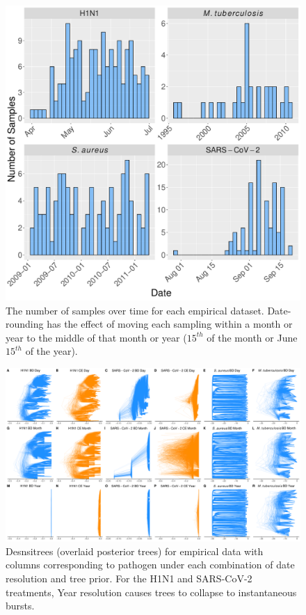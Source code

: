 \documentclass[12pt]{article}
\begin{document}
\begin{figure}[H]
    \centering
    \includegraphics[width=\textwidth]{figures/empirical_sampling_times.pdf}
    \caption{The number of samples over time for each empirical dataset. Date-rounding has the effect of moving each sampling within a month or year to the middle of that month or year ($15^{th}$ of the month or June $15^{th}$ of the year).}
    \label{fig:sampling}
\end{figure}

\begin{figure}[H]
    \centering
    \includegraphics[width=\textwidth]{empirical_densitrees.pdf}
    \caption{Desnsitrees (overlaid posterior trees) for empirical data with columns corresponding to pathogen under each combination of date resolution and tree prior. For the H1N1 and SARS-CoV-2 treatments, Year resolution causes trees to collapse to instantaneous bursts.}
    \label{fig:densitree}
\end{figure}
\end{document}
